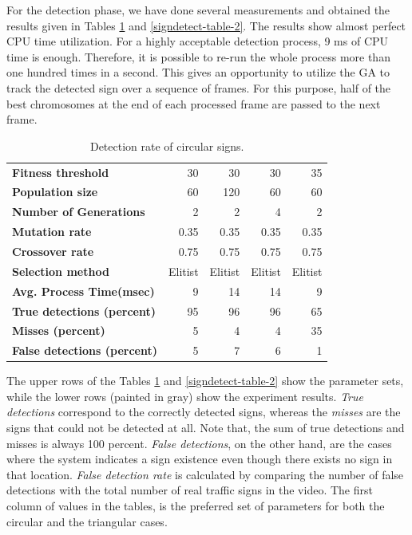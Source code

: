 \documentclass[review,number]{elsarticle}
\begin{document}
For the detection phase, we have done several measurements and obtained the results given in Tables \ref{signdetect-table-1} and \ref{signdetect-table-2}. The results show almost perfect CPU time utilization. For a highly acceptable detection process, 9 ms of CPU time is enough. Therefore, it is possible to re-run the whole process more than one hundred times in a second. This gives an opportunity to utilize the GA to track the detected sign over a sequence of frames. For this purpose, half of the best chromosomes at the end of each processed frame are passed to the next frame. 
\par
\begin{table}[ht]
	\centering
	\caption{Detection rate of circular signs.}
	\label{signdetect-table-1}
	\begin{tabular}{l r r r r}
		\hline
		\textbf{Fitness threshold} 		& 30 & 30 & 30 & 35 \\
		\textbf{Population size} 			& 60 & 120 & 60 & 60 \\
		\textbf{Number of Generations} 	& 2 & 2 & 4 & 2 \\
		\textbf{Mutation rate}     		& 0.35 & 0.35 & 0.35 & 0.35 \\
		\textbf{Crossover rate} 				& 0.75 & 0.75 & 0.75 & 0.75 \\
		\textbf{Selection method} 				& Elitist & Elitist & Elitist & Elitist \\
		\hline
		\rowcolor[rgb]{0.95,0.95,0.95}\textbf{Avg. Process Time(msec)}	& 9 & 14 & 14 & 9 \\
		\rowcolor[rgb]{0.95,0.95,0.95}\textbf{True detections (percent)} &  95 &  96 &  96 &  65 \\
		\rowcolor[rgb]{0.95,0.95,0.95}\textbf{Misses (percent)}	&  5 &  4 &  4 &  35 \\
		\hline
		\rowcolor[rgb]{0.95,0.95,0.95}\textbf{False detections (percent)}				&  5 &  7 &  6 &  1 \\
		\hline
	\end{tabular}
\end{table}
\par
The upper rows of the Tables \ref{signdetect-table-1} and \ref{signdetect-table-2} show the parameter sets, while the lower rows (painted in gray) show the experiment results. \textit{True detections} correspond to the correctly detected signs, whereas the \textit{misses} are the signs that could not be detected at all. Note that, the sum of true detections and misses is always 100 percent. \textit{False detections}, on the other hand, are the cases where the system indicates a sign existence even though there exists no sign in that location. \textit{False detection rate} is calculated by comparing the number of false detections with the total number of real traffic signs in the video. The first column of values in the tables, is the preferred set of parameters for both the circular and the triangular cases. 
\end{document}
